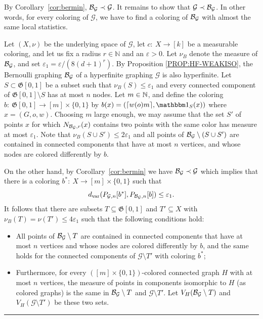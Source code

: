 \documentclass{article}
\newenvironment{proof}{{\bf Proof.}}{\hfill\rule{2mm}{2mm}\medskip}
\def\one{{\mathbbm1}}
\def\GG{\mathcal{G}}\def\HH{\mathcal{H}}\def\II{\mathcal{I}}
\def\Gf{\mathfrak{G}}\def\Hf{\mathfrak{H}}\def\If{\mathfrak{I}}
\def\eps{\varepsilon}
\begin{document}
\begin{proof}
By Corollary~\ref{cor:bermin}, $\BB_\GG\prec\GG$. It remains to show
that $\GG\prec\BB_\GG$. In other words, for every coloring of $\GG$,
we have to find a coloring of $\BB_\GG$ with almost the same local
statistics.

Let $(X,\nu)$ be the underlying space of $\GG$, let $c:~X\rightarrow
[k]$ be a measurable coloring, and let us fix a radius
$r\in\mathbb{N}$ and an $\eps>0$. Let $\nu_B$ denote the measure of
$\BB_\GG$, and set $\eps_1=\eps/(8(d+1)^r)$. By Proposition
\ref{PROP:HF-WEAKISO}, the Bernoulli graphing $\BB_\GG$ of a
hyperfinite graphing $\GG$ is also hyperfinite.  Let
$S\subset\Gf[0,1]$ be a subset such that $\nu_B(S)\le\eps_1$ and
every connected component of $\Gf[0,1]\setminus S$ has at most $n$
nodes. Let $m\in\mathbb{N}$, and define the coloring
$b:~\Gf[0,1]\rightarrow [m]\times\{0,1\}$ by $b(x)=(\lceil w(o)m
\rceil,\one_S(x))$ where $x=(G,o,w)$. Choosing $m$ large enough, we
may assume that the set $S'$ of points $x$ for which
$N_{\BB_\GG,r}(x)$ contains two points with the same color has
measure at most $\eps_1$. Note that $\nu_B(S \cup S') \le 2 \eps_1$
and all points of $\BB_\GG\setminus (S \cup S')$ are contained in
connected components that have at most $n$ vertices, and whose nodes
are colored differently by $b$.

On the other hand, by Corollary~\ref{cor:bermin} we have
$\BB_\GG\prec\GG$ which implies that there is a coloring
$b^*:~X\rightarrow [m]\times\{0,1\}$ such that
%
$$
d_\text{var}(P_{\GG,n}[b^*],P_{\BB_\GG,n}[b])\le \eps_1.
$$
%
It follows that there are subsets $T\subseteq
\Gf[0,1]$ and $T'\subseteq X$ with $\nu_B(T)=\nu(T')\le 4\eps_1$ such
that the following conditions hold:
\begin{itemize}
 \item[{\bf (a)}] All points of $\BB_\GG\setminus T$ are contained in
connected components that have at most $n$ vertices and whose nodes
are colored differently by $b$, and the same holds for the connected
components of $\GG \setminus T'$ with coloring $b^*$;

  \item[{\bf (b)}] Furthermore, for every $([m]\times\{0,1\})$-colored
connected graph $H$ with at most $n$ vertices, the measure of points
in components isomorphic to $H$ (as colored graphs) is the same in
$\BB_\GG\setminus T$ and $\GG\setminus T'$. Let $V_H(\BB_\GG
\setminus T)$ and $V_H(\GG \setminus T')$ be these two sets.

\end{itemize}


\end{proof}
\end{document}
